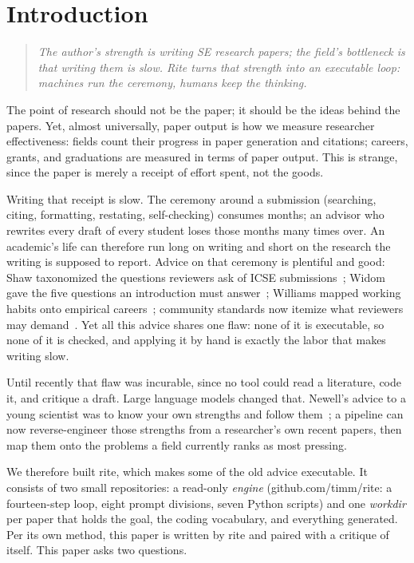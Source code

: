 \section{Introduction}

\begin{quote}
{\em The author's strength is writing SE research papers; the field's
bottleneck is that writing them is slow.
Rite turns that strength into an executable loop: machines run the
ceremony, humans keep the thinking.}
\end{quote}

The point of research should not be the paper; it should be the ideas
behind the papers.
Yet, almost universally, paper output is how we measure researcher
effectiveness: fields count their progress in paper generation and
citations; careers, grants, and graduations are measured in terms of
paper output.
This is strange, since the paper is merely a receipt of effort spent,
not the goods.

Writing that receipt is slow.
The ceremony around a submission (searching, citing, formatting,
restating, self-checking) consumes months; an advisor who rewrites
every draft of every student loses those months many times over.
An academic's life can therefore run long on writing and short on the
research the writing is supposed to report.
Advice on that ceremony is plentiful and good: Shaw taxonomized the
questions reviewers ask of ICSE submissions~\cite{shaw03}; Widom gave
the five questions an introduction must answer~\cite{widom06};
Williams mapped working habits onto empirical
careers~\cite{williams11}; community standards now itemize what
reviewers may demand~\cite{ralph21}.
Yet all this advice shares one flaw: none of it is executable, so none
of it is checked, and applying it by hand is exactly the labor that
makes writing slow.

Until recently that flaw was incurable, since no tool could read a
literature, code it, and critique a draft.
Large language models changed that.
Newell's advice to a young scientist was to know your own strengths
and follow them~\cite{newell91}; a pipeline can now reverse-engineer
those strengths from a researcher's own recent papers, then map them
onto the problems a field currently ranks as most pressing.

We therefore built rite, which makes some of the old advice
executable.
It consists of two small repositories: a read-only \textit{engine}
(github.com/timm/rite: a fourteen-step loop, eight prompt divisions,
seven Python scripts) and one \textit{workdir} per paper that holds
the goal, the coding vocabulary, and everything generated.
Per its own method, this paper is written by rite and paired with a
critique of itself.
This paper asks two questions.

